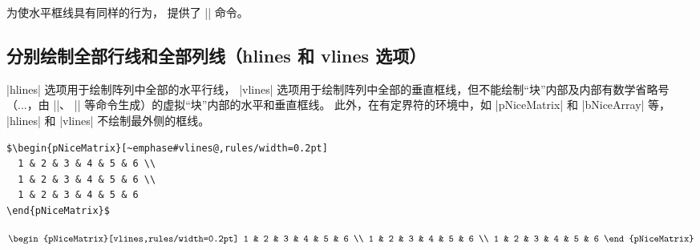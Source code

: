 \documentclass[dvipsnames]{article}%
\begin{document}
为使水平框线具有同样的行为， 提供了 |\Hline| 命令。

\subsection{分别绘制全部行线和全部列线（hlines 和 vlines 选项）}



|hlines| 选项用于绘制阵列中全部的水平行线， |vlines| 选项用于绘制阵列中全部的垂直框线，但不能绘制“块”内部及内部有数学省略号（...，由 |\Cdots|、 |\Vdots| 等命令生成）的虚拟“块”内部的水平和垂直框线。
此外，在有定界符的环境中，如 |{pNiceMatrix}| 和 |{bNiceArray}| 等， |hlines| 和 |vlines| 不绘制最外侧的框线。

\medskip
\begin{BVerbatim}[baseline=c,boxwidth=10.6cm]
$\begin{pNiceMatrix}[~emphase#vlines@,rules/width=0.2pt]
  1 & 2 & 3 & 4 & 5 & 6 \\
  1 & 2 & 3 & 4 & 5 & 6 \\
  1 & 2 & 3 & 4 & 5 & 6 
\end{pNiceMatrix}$
\end{BVerbatim}
$\begin{pNiceMatrix}[vlines,rules/width=0.2pt]
1 & 2 & 3 & 4 & 5 & 6 \\
1 & 2 & 3 & 4 & 5 & 6 \\
1 & 2 & 3 & 4 & 5 & 6 
\end{pNiceMatrix}$
\end{document}
